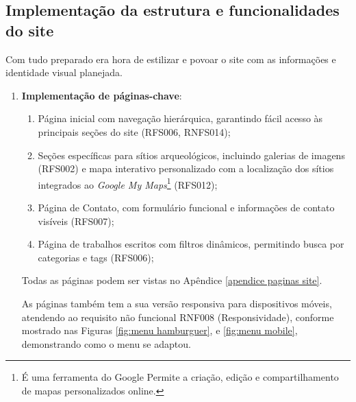     \subsection{Implementação da estrutura e funcionalidades do site}
    Com tudo preparado era hora de estilizar e povoar o site com as informações e identidade visual planejada.
    \begin{enumerate}
        \item \textbf{Implementação de páginas-chave}:
        \begin{enumerate}
            \item Página inicial com navegação hierárquica, garantindo fácil acesso às principais seções do site (RFS006, RNFS014);
            \item Seções específicas para sítios arqueológicos, incluindo galerias de imagens (RFS002) e mapa interativo personalizado com a localização dos sítios integrados ao \textit{Google My Maps}\footnote{É uma ferramenta do Google Permite a criação, edição e compartilhamento de mapas personalizados online.} (RFS012);
            \item Página de Contato, com formulário funcional e informações de contato visíveis (RFS007);
            \item Página de trabalhos escritos com filtros dinâmicos, permitindo busca por categorias e tags (RFS006);
            \end{enumerate}
            Todas as páginas podem ser vistas no Apêndice \ref{apendice paginas site}.

            As páginas também tem a sua versão responsiva para dispositivos móveis, atendendo ao requisito não funcional RNF008 (Responsividade), conforme mostrado nas Figuras \ref{fig:menu hamburguer}, e \ref{fig:menu mobile}, demonstrando como o menu se adaptou. 


\end{enumerate}
